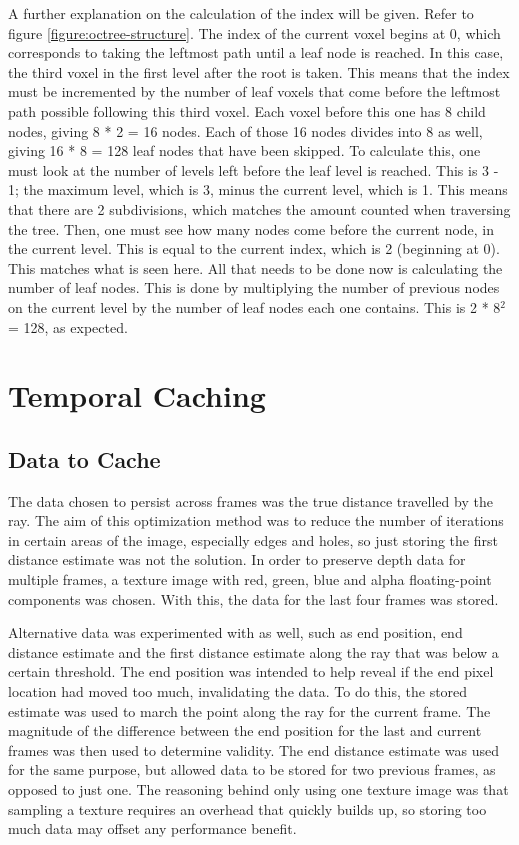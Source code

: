 A further explanation on the calculation of the index will be given. Refer to figure \ref{figure:octree-structure}. The index of the current voxel begins at 0, which corresponds to taking the leftmost path until a leaf node is reached. In this case, the third voxel in the first level after the root is taken. This means that the index must be incremented by the number of leaf voxels that come before the leftmost path possible following this third voxel. Each voxel before this one has 8 child nodes, giving 8 * 2 = 16 nodes. Each of those 16 nodes divides into 8 as well, giving 16 * 8 = 128 leaf nodes that have been skipped. To calculate this, one must look at the number of levels left before the leaf level is reached. This is 3 - 1; the maximum level, which is 3, minus the current level, which is 1. This means that there are 2 subdivisions, which matches the amount counted when traversing the tree. Then, one must see how many nodes come before the current node, in the current level. This is equal to the current index, which is 2 (beginning at 0). This matches what is seen here. All that needs to be done now is calculating the number of leaf nodes. This is done by multiplying the number of previous nodes on the current level by the number of leaf nodes each one contains. This is 2 * 8$^2$ = 128, as expected.

\section{Temporal Caching}

\subsection{Data to Cache}

The data chosen to persist across frames was the true distance travelled by the ray. The aim of this optimization method was to reduce the number of iterations in certain areas of the image, especially edges and holes, so just storing the first distance estimate was not the solution. In order to preserve depth data for multiple frames, a texture image with red, green, blue and alpha floating-point components was chosen. With this, the data for the last four frames was stored.\newline

Alternative data was experimented with as well, such as end position, end distance estimate and the first distance estimate along the ray that was below a certain threshold. The end position was intended to help reveal if the end pixel location had moved too much, invalidating the data. To do this, the stored estimate was used to march the point along the ray for the current frame. The magnitude of the difference between the end position for the last and current frames was then used to determine validity. The end distance estimate was used for the same purpose, but allowed data to be stored for two previous frames, as opposed to just one. The reasoning behind only using one texture image was that sampling a texture requires an overhead that quickly builds up, so storing too much data may offset any performance benefit.\newline

